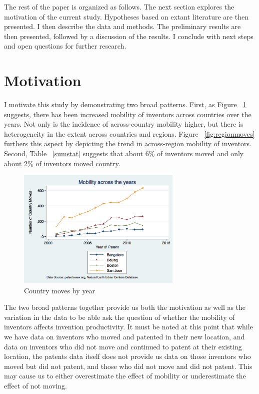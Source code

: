 \documentclass[12pt]{article}
\begin{document}
The rest of the paper is organized as follows. The next section explores the motivation of the current study. Hypotheses based on extant literature are then presented. I then describe the data and methods. The preliminary results are then presented, followed by a discussion of the results. I conclude with next steps and open questions for further research.

\section{Motivation}
I motivate this study by demonstrating two broad patterns.  First, as Figure ~\ref{fig:countrymoves} suggests,  there has been increased mobility of inventors across countries over the years. Not only is the incidence of across-country mobility higher, but there is heterogeneity in the extent across countries and regions. Figure ~\ref{fig:regionmoves} furthers this aspect by depicting the trend in across-region mobility of inventors. Second, Table ~\ref{sumstat} suggests that about 6\% of inventors moved  and only about 2\% of inventors moved country. 

\begin{figure}[h]
\begin{centering}
  \includegraphics[width=0.7\textwidth]{countrymoves}
  \caption{Country moves by year}
   \label{fig:countrymoves}
\end{centering}
\end{figure}

The two broad patterns together provide us both the motivation as well as the variation in the data to be able ask the question of whether the mobility of inventors affects invention productivity. It must be noted at this point that while we have data on inventors who moved and patented in their new location, and data on inventors who did not move and continued to patent at their existing location, the patents data itself does not provide us data on those inventors who moved but did not patent, and those who did not move and did not patent. This may cause us to either overestimate the effect of mobility or underestimate the effect of not moving. 
\end{document}
